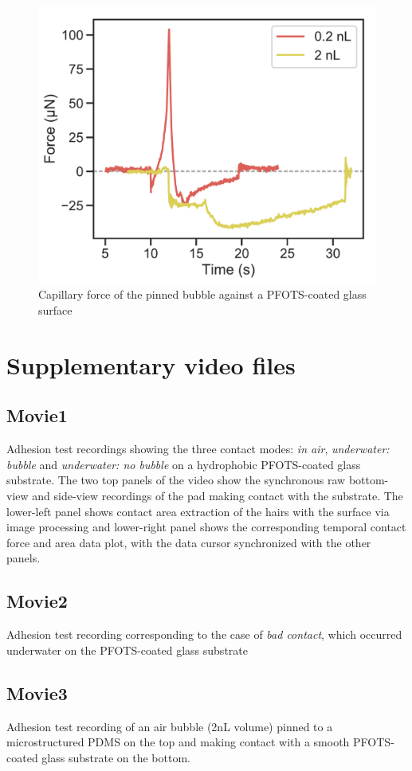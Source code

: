 \documentclass[english]{achemso}
\begin{document}
\begin{figure}[H]
\begin{centering}
\includegraphics{FigureS4-Expt_bubble_force}\caption{Capillary force of the pinned bubble against a PFOTS-coated glass surface \label{fig:Bubble_capillary_force}}
\par\end{centering}
\end{figure}

\section{Supplementary video files}

\subsection*{Movie1}
Adhesion test recordings showing the three contact modes: \emph{in air},  \emph{underwater: bubble} and  \emph{underwater: no bubble} on a hydrophobic PFOTS-coated glass substrate. The two top panels of the video show the synchronous raw bottom-view and side-view recordings of the pad making contact with the substrate. The lower-left panel shows contact area extraction of the hairs with the surface via image processing and lower-right panel shows the corresponding temporal contact force and area data plot, with the data cursor synchronized with the other panels.

\subsection*{Movie2}
Adhesion test recording corresponding to the case of \emph{bad contact}, which occurred underwater on the PFOTS-coated glass substrate

\subsection*{Movie3}
Adhesion test recording of an air bubble (2nL volume) pinned to a microstructured PDMS on the top and making contact with a smooth PFOTS-coated glass substrate on the bottom.


\end{document}
